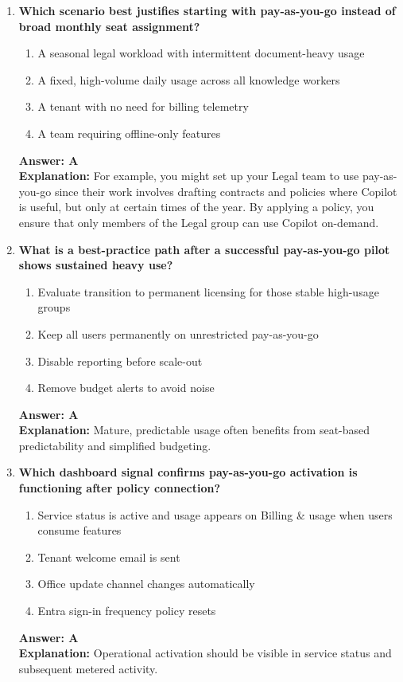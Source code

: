 \documentclass[10pt]{article}
\begin{document}
\begin{enumerate}[leftmargin=*]
\item \textbf{Which scenario best justifies starting with pay-as-you-go instead of broad monthly seat assignment?}
\begin{enumerate}[label=\Alph*.]
  \item A seasonal legal workload with intermittent document-heavy usage
  \item A fixed, high-volume daily usage across all knowledge workers
  \item A tenant with no need for billing telemetry
  \item A team requiring offline-only features
\end{enumerate}
\textbf{Answer: A}\\
\textbf{Explanation:} For example, you might set up your Legal team to use pay-as-you-go since their work involves drafting contracts and policies where Copilot is useful, but only at certain times of the year. By applying a policy, you ensure that only members of the Legal group can use Copilot on-demand.

\item \textbf{What is a best-practice path after a successful pay-as-you-go pilot shows sustained heavy use?}
\begin{enumerate}[label=\Alph*.]
  \item Evaluate transition to permanent licensing for those stable high-usage groups
  \item Keep all users permanently on unrestricted pay-as-you-go
  \item Disable reporting before scale-out
  \item Remove budget alerts to avoid noise
\end{enumerate}
\textbf{Answer: A}\\
\textbf{Explanation:} Mature, predictable usage often benefits from seat-based predictability and simplified budgeting.

\item \textbf{Which dashboard signal confirms pay-as-you-go activation is functioning after policy connection?}
\begin{enumerate}[label=\Alph*.]
  \item Service status is active and usage appears on Billing \& usage when users consume features
  \item Tenant welcome email is sent
  \item Office update channel changes automatically
  \item Entra sign-in frequency policy resets
\end{enumerate}
\textbf{Answer: A}\\
\textbf{Explanation:} Operational activation should be visible in service status and subsequent metered activity.


\end{enumerate}
\end{document}

